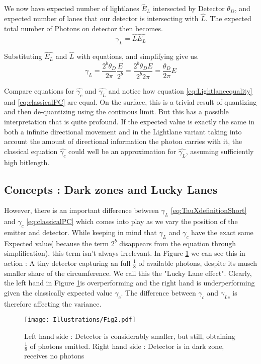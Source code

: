 \documentclass[notitlepage]{article}
\begin{document}
We now have expected number of lightlanes $\hat{E}_L$ intersected by Detector $\theta_D$,  and expected number of lanes that our detector is intersecting with  $\hat{L}$. The expected total number of Photons on detector then becomes.
\begin{equation}\label{eq:TauXdefinitionShort}
\gamma_L =  \hat{L} \hat{E_L} 
\end{equation}

Substituting $\hat{E_L}$ and $\hat{L} $ with equations, and simplifying give us.
\begin{equation}
 \gamma_L = \frac{2^b \theta_D}{2\pi} \frac{E}{2^b} = \frac{2^b \theta_D E}{2^b2\pi} =  \frac{ \theta_D}{2 \pi} E 
 \label{eq:Lightlaneequality}
\end{equation}

Compare equations for $\hat{\gamma_c} $ and $\hat{\gamma_L} $ and notice how equation  \eqref{eq:Lightlaneequality} and  \eqref{eq:classicalPC} are equal. On the surface, this is a trivial result of quantizing and then de-quantizing using the continous limit. But this has a possible interpretation that is quite profound. If the expected value is exactly the same in both a infinite directional movement and in the Lightlane variant taking into account the amount of directional information the photon carries with it, the classical equation  $\hat{\gamma_c} $ could well be an approximation for $\hat{\gamma_L} $, assuming sufficiently high bitlength.


\subsection{Concepts : Dark zones and Lucky Lanes}
However, there is an important difference between  $ \gamma_L $ \eqref{eq:TauXdefinitionShort} and $ \gamma_c$ \eqref{eq:classicalPC}  which comes into play as we vary the position of the emitter and detector.
While keeping in mind that  $\gamma_L$  and $ \gamma_c$ have the exact same Expected value( because the term $2^b$ disappears from the equation through simplification), this term isn't always irrelevant. In Figure \ref{fig:SmallDetector} we can see this in action : A tiny detector capturing an full $\frac{1}{8} $ of available photons, despite its musch smaller share of the circumference. We call this the "Lucky Lane effect". Clearly, the left hand in Figure \ref{fig:SmallDetector}is overperforming and the right hand is underperforming given the classically expected value $\gamma_c$. The difference between $\gamma_c$ and $\gamma_{Lc}$ is therefore affecting the variance. 
\begin{figure}[!ht]
  \centering

 \texttt{[image: Illustrations/Fig2.pdf]}
  \caption{Left hand side : Detector is considerably smaller, but still, obtaining $\frac{1}{8} $ of photons emitted. Right hand side : Detector is in dark zone, receives no photons }
    \label{fig:SmallDetector}
\end{figure}
\end{document}
